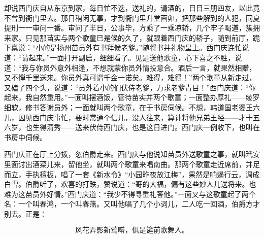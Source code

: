 却说西门庆自从东京到家，每日忙不迭，送礼的，请酒的，日日三朋四友，以此竟不曾到衙门里去。那日稍闲无事，才到衙门里升堂画卯，把那些解到的人犯，同夏提刑一一审问一番。审问了半日，公事毕，方乘了一乘凉轿，几个牢子喝道，簇拥来家。只见那苗实与两个歌童已是候的久了，就跟着西门庆的轿子，随到前厅，跪下禀说：“小的是扬州苗员外有书拜候老爹。”随将书并礼物呈上。西门庆连忙说道：“请起来。”一面打开副启，细细看了。见是送他歌童，心下喜之不胜，说道：“我与你员外意外相逢，不想就蒙你员外情投意合。酒后一言，就果然相赠，又不惮千里送来。你员外真可谓千金一诺矣。难得，难得！”两个歌童从新走过，又磕了四个头，说道：“员外着小的们伏侍老爹，万求老爹青目！”西门庆道：“你起来，我自然重用。”一面叫摆酒饭，管待苗实并两个歌童；一面整办厚礼——绫罗细软，修书答谢员外；一面就叫两个歌童，在于书房伺候。不想，韩道国老婆王六儿，因见西门庆事忙，要时常通个信儿，没人往来，算计将他兄弟王经——才十五六岁，也生得清秀——送来伏侍西门庆，也是这日进门。西门庆一例收下，也叫在书房中伺候。

西门庆正在厅上分拨，忽伯爵走来。西门庆与他说知苗员外送歌童之事，就叫玳安里面讨出酒菜儿来，留他坐，就叫两个歌童来唱南曲。那两个歌童走近席前，并足而立，手执檀板，唱了一套《新水令》“小园昨夜放江梅”，果然是响遏行云，调成白雪。伯爵听了，欢喜的打跌，赞说道：“哥的大福，偏有这些妙人儿送将来。也难为这苗员外好情。”西门庆道：“我少不得寻重礼答他。”一面又与这歌童起了两个名：一个叫春鸿，一个叫春燕。又叫他唱了几个小词儿，二人吃一回酒，伯爵方才别去。正是：

\[
风花弄影新莺啭，俱是筵前歌舞人。
\]
